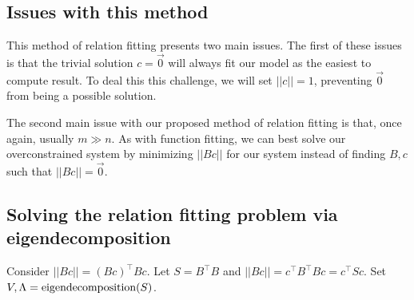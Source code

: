 \documentclass{article}%
\begin{document}
\subsection{Issues with this method}
This method of relation fitting presents two main issues. The first of these issues is that the trivial solution ${c}=\vec{0}$ will always fit our model as the easiest to compute result. To deal this this challenge, we will set $||{c}||= 1$, preventing $\vec{0}$ from being a possible solution.

The second main issue with our proposed method of relation fitting is that, once again, usually $m \gg n$. As with function fitting, we can best solve our overconstrained system by minimizing $||B{c}||$ for our system instead of finding $B, c$ such that $||Bc||=\vec{0}$.

\subsection{Solving the relation fitting problem via eigendecomposition}

Consider $||Bc||=(Bc)^\intercal Bc$. Let $S=B^\intercal B$ and $||Bc||=c^\intercal B^\intercal B c = c^\intercal S c$. Set $V, \Lambda = \textnormal{eigendecomposition}(S)$.
\end{document}
